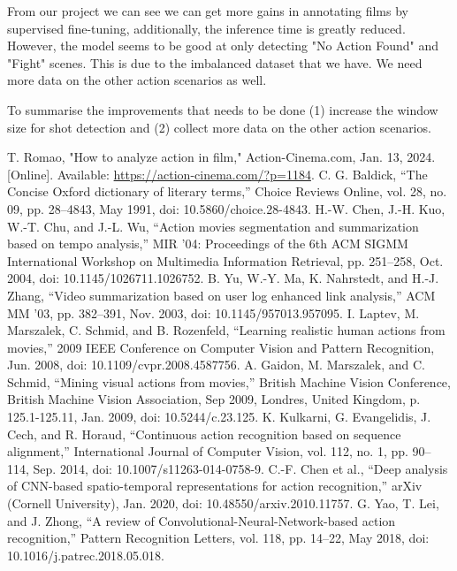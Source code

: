 \documentclass[12pt]{report}
\begin{document}
	From our project we can see we can get more gains in annotating films by supervised fine-tuning, additionally, the inference time is greatly reduced. However, the model seems to be good at only detecting "No Action Found" and "Fight" scenes. This is due to the imbalanced dataset that we have. We need more data on the other action scenarios as well.
	
	To summarise the improvements that needs to be done (1) increase the window size for shot detection and (2) collect more data on the other action scenarios.
	 
	\newpage
	\begin{thebibliography}{99}
		T. Romao, "How to analyze action in film," Action-Cinema.com, Jan. 13, 2024. [Online]. Available: \url{https://action-cinema.com/?p=1184}.
		 C. G. Baldick, “The Concise Oxford dictionary of literary terms,” Choice Reviews Online, vol. 28, no. 09, pp. 28–4843, May 1991, doi: 10.5860/choice.28-4843.
		H.-W. Chen, J.-H. Kuo, W.-T. Chu, and J.-L. Wu, “Action movies segmentation and summarization based on tempo analysis,” MIR ’04: Proceedings of the 6th ACM SIGMM International Workshop on Multimedia Information Retrieval, pp. 251–258, Oct. 2004, doi: 10.1145/1026711.1026752.
		B. Yu, W.-Y. Ma, K. Nahrstedt, and H.-J. Zhang, “Video summarization based on user log enhanced link analysis,” ACM MM ’03, pp. 382–391, Nov. 2003, doi: 10.1145/957013.957095.
		I. Laptev, M. Marszalek, C. Schmid, and B. Rozenfeld, “Learning realistic human actions from movies,” 2009 IEEE Conference on Computer Vision and Pattern Recognition, Jun. 2008, doi: 10.1109/cvpr.2008.4587756.
		A. Gaidon, M. Marszalek, and C. Schmid, “Mining visual actions from movies,” British Machine Vision Conference, British Machine Vision Association, Sep 2009, Londres, United Kingdom, p. 125.1-125.11, Jan. 2009, doi: 10.5244/c.23.125.
		K. Kulkarni, G. Evangelidis, J. Cech, and R. Horaud, “Continuous action recognition based on sequence alignment,” International Journal of Computer Vision, vol. 112, no. 1, pp. 90–114, Sep. 2014, doi: 10.1007/s11263-014-0758-9.
		C.-F. Chen et al., “Deep analysis of CNN-based spatio-temporal representations for action recognition,” arXiv (Cornell University), Jan. 2020, doi: 10.48550/arxiv.2010.11757.
		G. Yao, T. Lei, and J. Zhong, “A review of Convolutional-Neural-Network-based action recognition,” Pattern Recognition Letters, vol. 118, pp. 14–22, May 2018, doi: 10.1016/j.patrec.2018.05.018.

\end{thebibliography}
\end{document}
